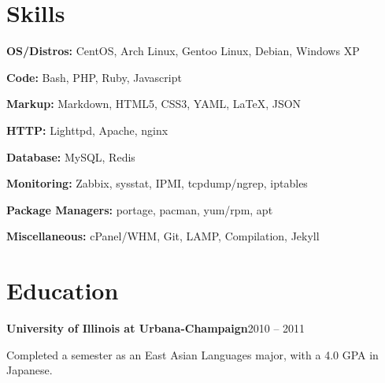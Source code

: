 \documentclass{article}
\newenvironment{entity}[2]{%
    \textbf{#1}\hfill #2\par
}{
    \vspace{0.1em}%
    \par%
}
\begin{document}
\section{Skills}

\textbf{OS/Distros:} CentOS, Arch Linux, Gentoo Linux, Debian, Windows XP\par
\textbf{Code:} Bash, PHP, Ruby, Javascript\par
\textbf{Markup:} Markdown, HTML5, CSS3, YAML, \LaTeX, JSON\par
\textbf{HTTP:} Lighttpd, Apache, nginx\par
\textbf{Database:} MySQL, Redis\par
\textbf{Monitoring:} Zabbix, sysstat, IPMI, tcpdump/ngrep, iptables\par
\textbf{Package Managers:} portage, pacman, yum/rpm, apt\par
\textbf{Miscellaneous:} cPanel/WHM, Git, LAMP, Compilation, Jekyll\par

\section{Education}

    \begin{entity}{University of Illinois at Urbana-Champaign}{2010 -- 2011}

Completed a semester as an East Asian Languages major, with a 4.0 GPA in Japanese.
    \end{entity}
\end{document}
